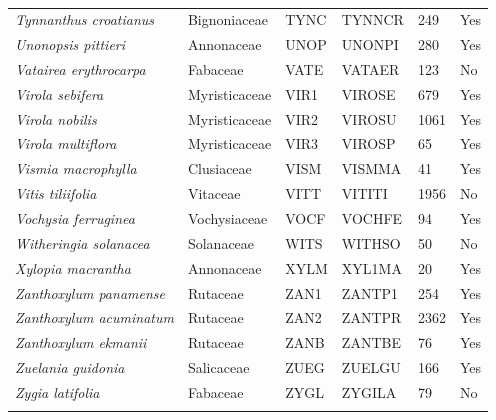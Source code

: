 \documentclass[11pt]{article}
\begin{document}
\begin{longtable}{@{}llllll@{}}
\textit{Tynnanthus croatianus}                        & Bignoniaceae     & TYNC   & TYNNCR & 249             & Yes       \\
\textit{Unonopsis pittieri}                           & Annonaceae       & UNOP   & UNONPI & 280             & Yes       \\
\textit{Vatairea erythrocarpa}                        & Fabaceae         & VATE   & VATAER & 123             & No        \\
\textit{Virola sebifera}                              & Myristicaceae    & VIR1   & VIROSE & 679             & Yes       \\
\textit{Virola nobilis}                               & Myristicaceae    & VIR2   & VIROSU & 1061            & Yes       \\
\textit{Virola multiflora}                            & Myristicaceae    & VIR3   & VIROSP & 65              & Yes       \\
\textit{Vismia macrophylla}                           & Clusiaceae       & VISM   & VISMMA & 41              & Yes       \\
\textit{Vitis tiliifolia}                             & Vitaceae         & VITT   & VITITI & 1956            & No        \\
\textit{Vochysia ferruginea}                          & Vochysiaceae     & VOCF   & VOCHFE & 94              & Yes       \\
\textit{Witheringia solanacea}                        & Solanaceae       & WITS   & WITHSO & 50              & No        \\
\textit{Xylopia macrantha}                            & Annonaceae       & XYLM   & XYL1MA & 20              & Yes       \\
\textit{Zanthoxylum panamense}                        & Rutaceae         & ZAN1   & ZANTP1 & 254             & Yes       \\
\textit{Zanthoxylum acuminatum}                       & Rutaceae         & ZAN2   & ZANTPR & 2362            & Yes       \\
\textit{Zanthoxylum ekmanii}                          & Rutaceae         & ZANB   & ZANTBE & 76              & Yes       \\
\textit{Zuelania guidonia}                            & Salicaceae       & ZUEG   & ZUELGU & 166             & Yes       \\
\textit{Zygia latifolia}                              & Fabaceae         & ZYGL   & ZYGILA & 79              & No        \\ \bottomrule
\caption{}
\label{tab:my-table}
\end{longtable}
\newpage
\end{document}
